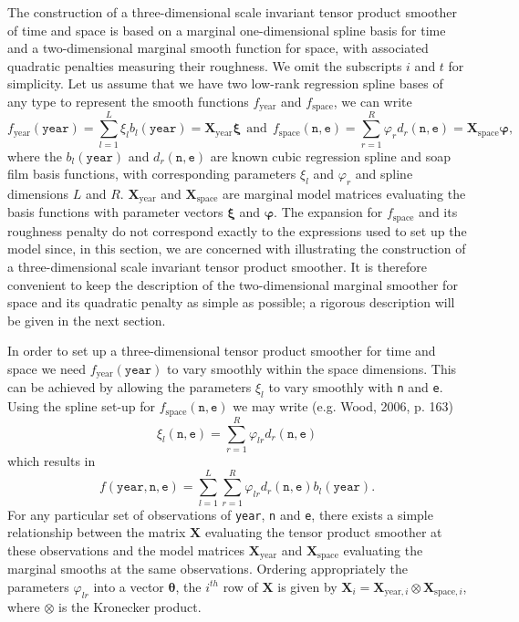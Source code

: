 The construction of a three-dimensional scale invariant tensor product smoother of time and space is based on a marginal one-dimensional spline basis for time and a two-dimensional marginal smooth function for space, with associated quadratic penalties measuring their roughness. We omit the subscripts $i$ and $t$ for simplicity. Let us assume that we have two low-rank regression spline bases of any type to represent the smooth functions $f_\text{year}$ and $f_\text{space}$, we can write
$$
f_\text{year}(\texttt{year})=\sum_{l=1}^L \xi_l b_l(\texttt{year})=\textbf{X}_\text{year}\bm\xi \ \ \text{and} \ \ f_\text{space}(\texttt{n},\texttt{e})=\sum_{r=1}^R \varphi_r d_r(\texttt{n},\texttt{e})=\textbf{X}_\text{space}\bm\varphi,
$$
where the $b_l(\texttt{year})$ and $d_r(\texttt{n},\texttt{e})$ are known cubic regression spline and soap film basis functions, with corresponding parameters $\xi_l$ and $\varphi_r$ and spline dimensions $L$ and $R$. $\textbf{X}_\text{year}$ and $\textbf{X}_\text{space}$ are marginal model matrices evaluating the basis functions with parameter vectors $\bm\xi$ and $\bm\varphi$. The expansion for $f_\text{space}$ and its roughness penalty do not correspond exactly to the expressions used to set up the model since, in this section, we are concerned with illustrating the construction of a three-dimensional scale invariant tensor product smoother. It is therefore convenient to keep the description of the two-dimensional marginal smoother for space and its quadratic penalty as simple as possible; a rigorous description will be given in the next section. 

In order to set up a three-dimensional tensor product smoother for time and space we need $f_\text{year}(\texttt{year})$ to vary smoothly within the space dimensions. This can be achieved by allowing the parameters $\xi_l$ to vary smoothly with \texttt{n} and \texttt{e}. Using the spline set-up for $f_\text{space}(\texttt{n},\texttt{e})$ we may write (e.g. Wood, 2006, p. 163)
$$
\xi_l(\texttt{n},\texttt{e})=\sum_{r=1}^R \varphi_{lr} d_r(\texttt{n},\texttt{e})
$$    
which results in
$$
f(\texttt{year},\texttt{n},\texttt{e})=\sum_{l=1}^L \sum_{r=1}^R \varphi_{lr} d_r(\texttt{n},\texttt{e}) b_l(\texttt{year}). 
$$
For any particular set of observations of \texttt{year}, \texttt{n} and \texttt{e}, there exists a simple relationship between the matrix $\textbf{X}$ evaluating the tensor product smoother at these observations and the model matrices $\textbf{X}_\text{year}$ and $\textbf{X}_\text{space}$ evaluating the marginal smooths at the same observations. Ordering appropriately the parameters $\varphi_{lr}$ into a vector $\bm\theta$, the $i^{th}$ row of $\textbf{X}$ is given by $\textbf{X}_{i}=\textbf{X}_{\text{year},i}\otimes\textbf{X}_{\text{space},i}$, where $\otimes$ is the Kronecker product. 

